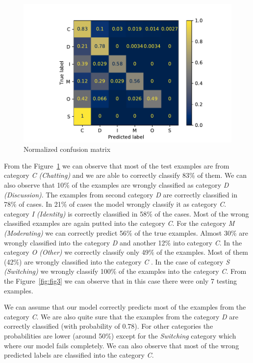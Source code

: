 \documentclass[11pt,a4paper]{article}
\begin{document}
\begin{figure}[h]
    \centering
    \includegraphics[width=1.0\columnwidth]{Figures/confusionMatrixCategoryNormalized.pdf}
    \caption{Normalized confusion matrix}
    \label{fig:fig4}
\end{figure}

From the Figure~\ref{fig:fig4} we can observe that most of the test examples are from category \textit{C (Chatting)} and we are able to correctly classify 83\% of them.
We can also observe that 10\% of the examples are wrongly classified as category \textit{D (Discussion)}.
The examples from second category \textit{D} are correctly classified in 78\% of cases.
In 21\% of cases the model wrongly classify it as category \textit{C}.
category \textit{I (Identity)} is correctly classified in 58\% of the cases.
Most of the wrong classified examples are again putted into the category \textit{C}.
For the category \textit{M (Moderating)} we can correctly predict 56\% of the true examples.
Almost 30\% are wrongly classified into the category \textit{D} and another 12\% into category \textit{C}.
In the category \textit{O (Other)} we correctly classify only 49\% of the examples.
Most of them (42\%) are wrongly classified into the category \textit{C }.
In the case of category \textit{S (Switching)} we wrongly classify 100\% of the examples into the category \textit{C}.
From the Figure~\ref{fig:fig3} we can observe that in this case there were only 7 testing examples.

We can assume that our model correctly predicts most of the examples from the category \textit{C}.
We are also quite sure that the examples from the category \textit{D} are correctly classified (with probability of 0.78).
For other categories the probabilities are lower (around 50\%) except for the \textit{Switching} category which where our model fails completely.
We can also observe that most of the wrong predicted labels are classified into the category \textit{C}.
\end{document}
